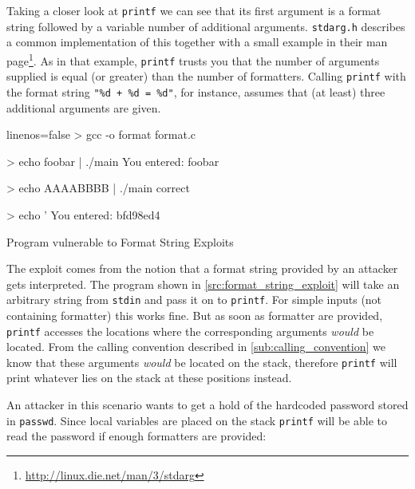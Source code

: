 \documentclass[article]{uibk}
\begin{document}
Taking a closer look at \texttt{printf} we can see that its first argument is a
format string followed by a variable number of additional arguments.
\texttt{stdarg.h} describes a common implementation of this together with a
small example in their man
page\footnote{\url{http://linux.die.net/man/3/stdarg}}. As in that example,
\texttt{printf} trusts you that the number of arguments supplied is equal (or
greater) than the number of formatters. Calling \texttt{printf} with the format
string \texttt{"\%d + \%d = \%d"}, for instance, assumes that (at least) three
additional arguments are given.

\begin{listing}[h!]
    \begin{minipage}[t]{0.4\textwidth}
    \end{minipage}\hfill
    \begin{minipage}[t]{0.5\textwidth}
        \begin{code*}{linenos=false}
            > gcc -o format format.c


            > echo foobar | ./main
            You entered:
            foobar


            > echo AAAABBBB | ./main
            correct


            > echo '%
            You entered:
            bfd98ed4
        \end{code*}
    \end{minipage}
    \caption{Program vulnerable to Format String Exploits}
    \label{src:format_string_exploit}
\end{listing}

The exploit comes from the notion that a format string provided by an attacker
gets interpreted. The program shown in \cref{src:format_string_exploit} will
take an arbitrary string from \texttt{stdin} and pass it on to \texttt{printf}.
For simple inputs (not containing formatter) this works fine. But as soon as
formatter are provided, \texttt{printf} accesses the locations where the
corresponding arguments \emph{would} be located. From the calling convention
described in \cref{sub:calling_convention} we know that these arguments
\emph{would} be located on the stack, therefore \texttt{printf} will print
whatever lies on the stack at these positions instead.

An attacker in this scenario wants to get a hold of the hardcoded password
stored in \texttt{passwd}. Since local variables are placed on the stack
\texttt{printf} will be able to read the password if enough formatters are
provided:
\end{document}
